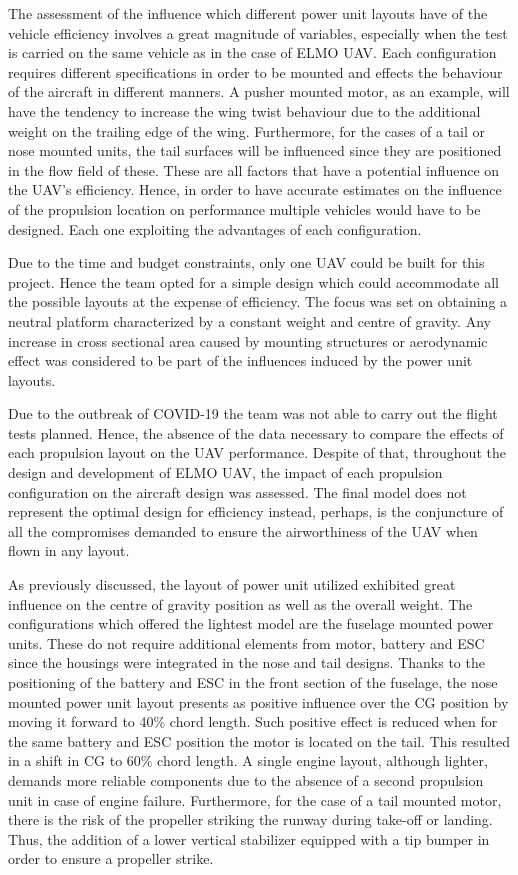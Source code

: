 \documentclass[../../main.tex]{subfiles}
\begin{document}
The assessment of the influence which different power unit layouts have of the vehicle efficiency involves a great magnitude of variables, especially when the test is carried on the same vehicle as in the case of ELMO UAV.
Each configuration requires different specifications in order to be mounted and effects the behaviour of the aircraft in different manners.
A pusher mounted motor, as an example, will have the tendency to increase the wing twist behaviour due to the additional weight on the trailing edge of the wing.
Furthermore, for the cases of a tail or nose mounted units, the tail surfaces will be influenced since they are positioned in the flow field of these.
These are all factors that have a potential influence on the UAV’s efficiency.
Hence, in order to have accurate estimates on the influence of the propulsion location on performance multiple vehicles would have to be designed.
Each one exploiting the advantages of each configuration. 

Due to the time and budget constraints, only one UAV could be built for this project.
Hence the team opted for a simple design which could accommodate all the possible layouts at the expense of efficiency.
The focus was set on obtaining a neutral platform characterized by a constant weight and centre of gravity.
Any increase in cross sectional area caused by mounting structures or aerodynamic effect was considered to be part of the influences induced by the power unit layouts. 

Due to the outbreak of COVID-19 the team was not able to carry out the flight tests planned.
Hence, the absence of the data necessary to compare the effects of each propulsion layout on the UAV performance.
Despite of that, throughout the design and development of ELMO UAV, the impact of each propulsion configuration on the aircraft design was assessed.
The final model does not represent the optimal design for efficiency instead, perhaps, is the conjuncture of all the compromises demanded to ensure the airworthiness of the UAV when flown in any layout. 

As previously discussed, the layout of power unit utilized exhibited great influence on the centre of gravity position as well as the overall weight.
The configurations which offered the lightest model are the fuselage mounted power units.
These do not require additional elements from motor, battery and ESC since the housings were integrated in the nose and tail designs.
Thanks to the positioning of the battery and ESC in the front section of the fuselage, the nose mounted power unit layout presents as positive influence over the CG position by moving it forward to 40\% chord length.
Such positive effect is reduced when for the same battery and ESC position the motor is located on the tail.
This resulted in a shift in CG to 60\% chord length.
A single engine layout, although lighter, demands more reliable components due to the absence of a second propulsion unit in case of engine failure.
Furthermore, for the case of a tail mounted motor, there is the risk of the propeller striking the runway during take-off or landing.
Thus, the addition of a lower vertical stabilizer equipped with a tip bumper in order to ensure a propeller strike. 
\end{document}
